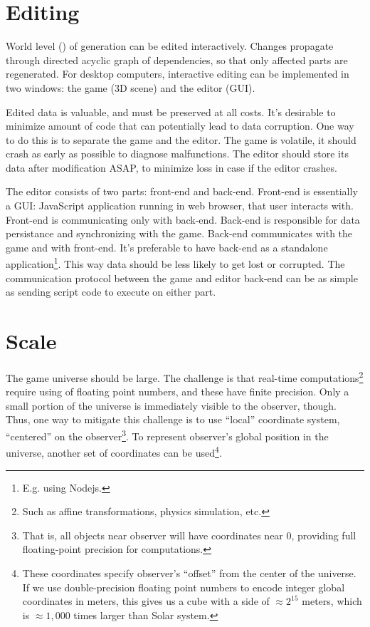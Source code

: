 \documentclass[12pt]{article}
\begin{document}
\section{Editing}

World level () of generation can be edited
interactively.
Changes propagate through directed acyclic graph of dependencies, so
that only affected parts are regenerated.
For desktop computers, interactive editing can be implemented in two
windows: the game (3D scene) and the editor (GUI).

Edited data is valuable, and must be preserved at all costs.
It's desirable to minimize amount of code that can potentially lead to
data corruption.
One way to do this is to separate the game and the editor.
The game is volatile, it should crash as early as possible to diagnose
malfunctions.
The editor should store its data after modification ASAP, to minimize loss
in case if the editor crashes.

The editor consists of two parts: front-end and back-end.
Front-end is essentially a GUI: JavaScript application running in web
browser, that user interacts with.
Front-end is communicating only with back-end.
Back-end is responsible for data persistance and synchronizing with the game.
Back-end communicates with the game and with front-end.
It's preferable to have back-end as a standalone application\footnote{
    E.g. using Nodejs.
}.
This way data should be less likely to get lost or corrupted.
The communication protocol between the game and editor back-end can be
as simple as sending script code to execute on either part.

\section{Scale}

The game universe should be large.
The challenge is that real-time computations\footnote{
    Such as affine transformations, physics simulation, etc.
} require using of floating point numbers, and these have finite precision.
Only a small portion of the universe is immediately visible to the observer,
though.
Thus, one way to mitigate this challenge is to use ``local'' coordinate system,
``centered'' on the observer\footnote{
    That is, all objects near observer will have coordinates near \(0\),
    providing full floating-point precision for computations.
}.
To represent observer's global position in the universe, another set of
coordinates can be used\footnote{
    These coordinates specify observer's ``offset'' from the center of the
    universe.
    If we use double-precision floating point numbers to encode integer
    global coordinates in meters, this gives us a cube with a side of
    \(\approx 2^{15}\) meters, which is \(\approx 1,000\) times larger than
    Solar system.
}.
\end{document}

